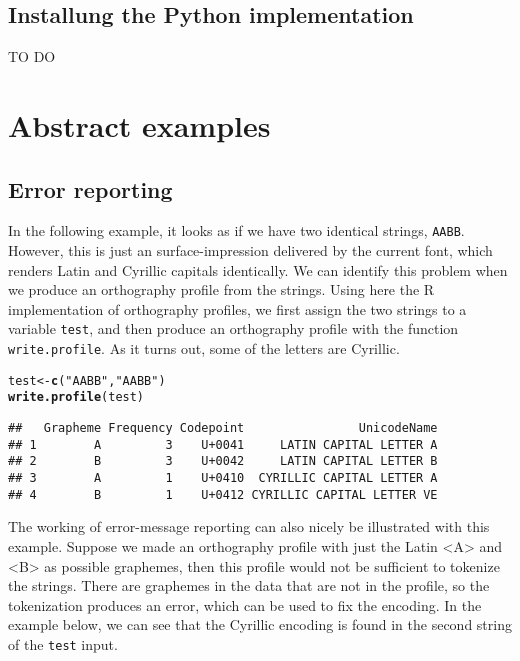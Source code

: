 \documentclass[output=inprep,
		biblatex
		]{LSP/langsci}\usepackage[]{graphicx}\usepackage[]{color}
\makeatletter
\newcommand{\hlstr}[1]{\textcolor[rgb]{0.192,0.494,0.8}{#1}}%
\newcommand{\hlstd}[1]{\textcolor[rgb]{0.345,0.345,0.345}{#1}}%
\newcommand{\hlkwb}[1]{\textcolor[rgb]{0.69,0.353,0.396}{#1}}%
\newcommand{\hlkwd}[1]{\textcolor[rgb]{0.737,0.353,0.396}{\textbf{#1}}}%
\newenvironment{kframe}{%
 \def\at@end@of@kframe{}%
 \ifinner\ifhmode%
  \def\at@end@of@kframe{\end{minipage}}%
  \begin{minipage}{\columnwidth}%
 \fi\fi%
 \def\FrameCommand##1{\hskip\@totalleftmargin \hskip-\fboxsep
 \colorbox{shadecolor}{##1}\hskip-\fboxsep
     \hskip-\linewidth \hskip-\@totalleftmargin \hskip\columnwidth}%
 \MakeFramed {\advance\hsize-\width
   \@totalleftmargin\z@ \linewidth\hsize
   \@setminipage}}%
 {\par\unskip\endMakeFramed%
 \at@end@of@kframe}
\newenvironment{knitrout}{}{} %
\makeatother
\begin{document}
\subsection*{Installung the Python implementation}

TO DO

\section{Abstract examples}

\subsection*{Error reporting}

In the following example, it looks as if we have two identical strings,
\texttt{AABB}. However, this is just an surface-impression delivered by the
current font, which renders Latin and Cyrillic capitals identically. We can
identify this problem when we produce an orthography profile from the strings.
Using here the R implementation of orthography profiles, we first assign the two
strings to a variable \texttt{test}, and then produce an orthography profile
with the function \texttt{write.profile}. As it turns out, some of the letters 
are Cyrillic.

\begin{knitrout}\footnotesize
{}\color{fgcolor}\begin{kframe}
\begin{alltt}
\hlstd{test} \hlkwb{<-} \hlkwd{c}\hlstd{(}\hlstr{"AABB"}\hlstd{,} \hlstr{"AАBВ"}\hlstd{)}
\hlkwd{write.profile}\hlstd{(test)}
\end{alltt}
\begin{verbatim}
##   Grapheme Frequency Codepoint                UnicodeName
## 1        A         3    U+0041     LATIN CAPITAL LETTER A
## 2        B         3    U+0042     LATIN CAPITAL LETTER B
## 3        А         1    U+0410  CYRILLIC CAPITAL LETTER A
## 4        В         1    U+0412 CYRILLIC CAPITAL LETTER VE
\end{verbatim}
\end{kframe}
\end{knitrout}

\noindent The working of error-message reporting can also nicely be illustrated with this
example. Suppose we made an orthography profile with just the Latin <A> and <B> 
as possible graphemes, then this profile would not be sufficient to tokenize the 
strings. There are graphemes in the data that are not in the profile, so the 
tokenization produces an error, which can be used to fix the encoding. In the 
example below, we can see that the Cyrillic encoding is found in the second 
string of the \texttt{test} input.
\end{document}
